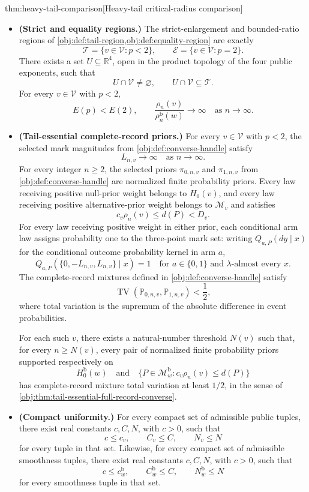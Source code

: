 \begin{theoremv}{thm:heavy-tail-comparison}[Heavy-tail critical-radius comparison]
\begin{itemize}
\item \textbf{(Strict and equality regions.)}
The strict-enlargement and bounded-ratio regions of \cref{obj:def:tail-region,obj:def:equality-region} are exactly
\[
\mathcal T=\{v\in\mathcal V:p<2\},
\qquad
\mathcal E=\{v\in\mathcal V:p=2\}.
\]
There exists a set \(U\subseteq\mathbb R^4\), open in the product topology of the four public exponents, such that
\[
U\cap\mathcal V\ne\varnothing,
\qquad
U\cap\mathcal V\subseteq\mathcal T.
\]
For every \(v\in\mathcal V\) with \(p<2\),
\[
E(p)<E(2),
\qquad
\frac{\rho_n(v)}{\rho_n^{\mathrm b}(w)}
\longrightarrow\infty
\quad\text{as }n\longrightarrow\infty.
\]

\item \textbf{(Tail-essential complete-record priors.)}
For every \(v\in\mathcal V\) with \(p<2\), the selected mark magnitudes from \cref{obj:def:converse-handle} satisfy
\[
L_{n,v}\longrightarrow\infty
\quad\text{as }n\longrightarrow\infty.
\]
For every integer \(n\ge2\), the selected priors
\(\pi_{0,n,v}\) and \(\pi_{1,n,v}\) from \cref{obj:def:converse-handle} are normalized finite probability priors. Every law receiving positive null-prior weight belongs to \(H_0(v)\), and every law receiving positive alternative-prior weight belongs to \(\mathcal M_v\) and satisfies
\[
c_v\rho_n(v)\le d(P)<D_v.
\]
For every law receiving positive weight in either prior, each conditional arm law assigns probability one to the three-point mark set: writing \(Q_{a,P}(dy\mid x)\) for the conditional outcome probability kernel in arm \(a\),
\[
Q_{a,P}\!\left(\{0,-L_{n,v},L_{n,v}\}\mid x\right)=1
\quad
\text{for }a\in\{0,1\}\text{ and }\lambda\text{-almost every }x.
\]
The complete-record mixtures defined in \cref{obj:def:converse-handle} satisfy
\[
\operatorname{TV}\!\left(\mathbb P_{0,n,v},\mathbb P_{1,n,v}\right)<\frac12,
\]
where total variation is the supremum of the absolute difference in event probabilities.

For each such \(v\), there exists a natural-number threshold \(N(v)\) such that, for every \(n\ge N(v)\), every pair of normalized finite probability priors supported respectively on
\[
H_0^{\mathrm b}(w)
\quad\text{and}\quad
\{P\in\mathcal M^{\mathrm b}_w:c_v\rho_n(v)\le d(P)\}
\]
has complete-record mixture total variation at least \(1/2\), in the sense of \cref{obj:thm:tail-essential-full-record-converse}.

\item \textbf{(Compact uniformity.)}
For every compact set of admissible public tuples, there exist real constants \(c,C,N\), with \(c>0\), such that
\[
c\le c_v,\qquad C_v\le C,\qquad N_v\le N
\]
for every tuple in that set. Likewise, for every compact set of admissible smoothness tuples, there exist real constants \(c,C,N\), with \(c>0\), such that
\[
c\le c_w^{\mathrm b},
\qquad
C_w^{\mathrm b}\le C,
\qquad
N_w^{\mathrm b}\le N
\]
for every smoothness tuple in that set.
\end{itemize}
\end{theoremv}

